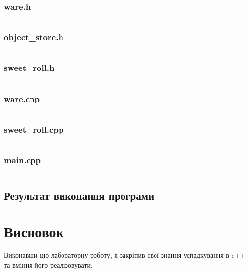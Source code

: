 \documentclass[a4paper, 12pt, oneside]{extarticle}
\begin{document}
\subsubsection{ware.h}
\inputminted{c++}{task2/include/ware.h}
\subsubsection{object_store.h}
\inputminted{c++}{task2/include/object_store.h}
\subsubsection{sweet_roll.h}
\inputminted{c++}{task2/include/sweet_roll.h}

\subsubsection{ware.cpp}
\inputminted{c++}{task2/src/ware.cpp}
\subsubsection{sweet_roll.cpp}
\inputminted{c++}{task2/src/sweet_roll.cpp}
\subsubsection{main.cpp}
\inputminted{c++}{task2/src/main.cpp}

\subsection*{Результат виконання програми}



\section*{Висновок}

Виконавши цю лабораторну роботу, я закріпив свої
знання успадкування в c++ та вміння його реалізовувати.
\end{document}

